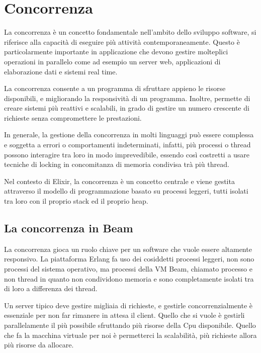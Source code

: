 \section{Concorrenza}

La concorrenza è un concetto fondamentale nell'ambito
dello sviluppo software, si riferisce alla capacità
di eseguire più attività contemporaneamente.
Questo è particolarmente importante in applicazione
che devono gestire molteplici operazioni in parallelo
come ad esempio un server web, applicazioni di
elaborazione dati e sistemi real time.

La concorrenza consente a un programma di sfruttare appieno
le risorse disponibili, e migliorando
la responsività di un programma.
Inoltre, permette di creare sistemi più reattivi e
scalabili, in grado di gestire un numero crescente di
richieste senza compromettere le prestazioni.

In generale, la gestione della concorrenza in molti linguaggi
può essere complessa
e soggetta a errori o comportamenti indeterminati, infatti,
più processi o thread possono interagire tra loro in modo
imprevedibile, essendo così costretti a usare tecniche di
locking in concomitanza di memoria condivisa trà più thread.

Nel contesto di Elixir, la concorrenza è un concetto centrale
e viene gestita attraverso il modello di programmazione
basato su processi leggeri, tutti isolati tra loro con il proprio
stack ed il proprio heap.


\subsection{La concorrenza in Beam}

La concorrenza gioca un ruolo chiave per un software
che vuole essere altamente responsivo.
La piattaforma Erlang fa uso dei cosiddetti processi leggeri,
non sono processi del 
sistema operativo, ma processi della
VM Beam, chiamato processo e non thread in quanto non
condividono memoria e sono completamente
isolati tra di loro a differenza dei thread.

Un server tipico deve gestire migliaia di richieste, e
gestirle concorrenzialmente è essenziale per non far
rimanere in attesa il client. Quello che si vuole è
gestirli parallelamente il più possibile sfruttando
più risorse della Cpu disponibile.
Quello che fa la macchina virtuale per noi è permetterci
la scalabilità, più richieste allora più risorse da allocare.

